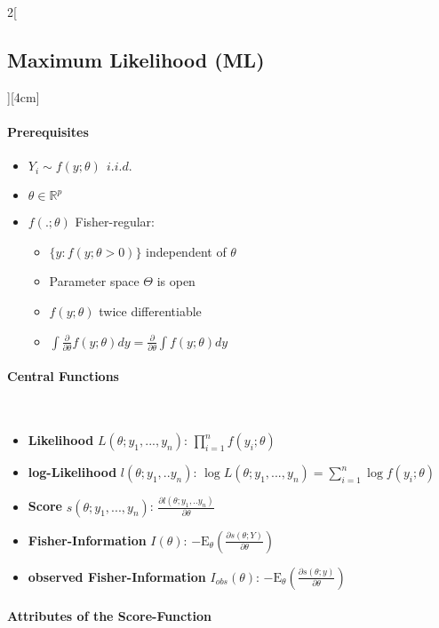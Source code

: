 \documentclass[8pt]{extarticle}
\begin{document}
\begin{multicols}{2}[\subsection{Maximum Likelihood (ML)}][4cm]
  \paragraph{Prerequisites}
  
  \begin{itemize}
  \item $Y_i \sim f(y;\theta)\:\: i.i.d.$
  \item $\theta \in \mathbb{R}^p$
  \item $f(.;\theta)$ Fisher-regular:
  \begin{itemize}
  \item $\{ y: f (y; \theta > 0) \}$ independent of $\theta$
  \item Parameter space $\Theta$ is open
  \item $f(y;\theta)$ twice differentiable
  \item $\int \frac{\partial}{\partial \theta} f(y;\theta)dy = \frac{\partial}{\partial \theta} \int f(y;\theta)dy$
  \end{itemize}
  \end{itemize}
  
  \paragraph{Central Functions} \ \\
  \begin{itemize}
  \item \textbf{Likelihood} $L(\theta;y_1,...,y_n)$: $\prod_{i=1}^n f(y_i;\theta)$
  \item \textbf{log-Likelihood} $l(\theta;y_1,..y_n)$: 
$\log L(\theta;y_1,...,y_n) = \sum_{i=1}^n \log f(y_i;\theta)$
  \item \textbf{Score} $s(\theta;y_1,...,y_n)$: $\frac{\partial l(\theta;y_1,..y_n)}{\partial \theta}$
  \item \textbf{Fisher-Information} $I(\theta)$: $-\mathrm{E}_\theta\left(\frac{\partial s(\theta;Y)}{\partial\theta}\right)$
  \item \textbf{observed Fisher-Information} $I_{obs}(\theta)$: $-\mathrm{E}_\theta\left(\frac{\partial s(\theta;y)}{\partial\theta}\right)$
  \end{itemize}
  
  
  \paragraph{Attributes of the Score-Function} \ \\
  

\end{multicols}
\end{document}
